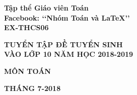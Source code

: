 \documentclass[11pt,a4paper]{book}
\renewcommand{\baselinestretch}{1.4}
\begin{document}
\providecommand*{\dx}{\ensuremath{\mathrm{\,d}}x}
\providecommand*{\unit}[1]{\ensuremath{\mathrm{\,#1}}}

\begin{titlepage}
\begin{center}
\fontsize{17}{0}\selectfont
\textbf{Tập thể Giáo viên Toán}\\
\textbf{Facebook: \lq\lq Nhóm Toán và LaTeX\rq\rq}\\
\vspace{4cm}
\textbf{\fontsize{20}{0}\selectfont EX-THCS06}
\end{center}

\begin{center}

\vspace{1cm}

 \textbf{\fontsize{30}{0}\selectfont T\fontsize{25}{0}\selectfont UYỂN TẬP ĐỀ TUYỂN SINH \\ VÀO LỚP 10 NĂM HỌC 2018-2019}
 \vspace{1cm}
 
 \textbf{\fontsize{35}{0}\selectfont MÔN TOÁN}\\ 
\end{center}


\vfill{
\begin{center}
\fontsize{17}{0}\textbf{THÁNG 7-2018}
\end{center}
}
\end{titlepage}
\pagestyle{empty}
\renewcommand{\headrulewidth}{0.4pt}
\renewcommand{\baselinestretch}{1.3}


\pagestyle{fancy}
\chead{\empty}
\rhead{\currfilename}
\lfoot{\empty}
\tableofcontents
\end{document}
